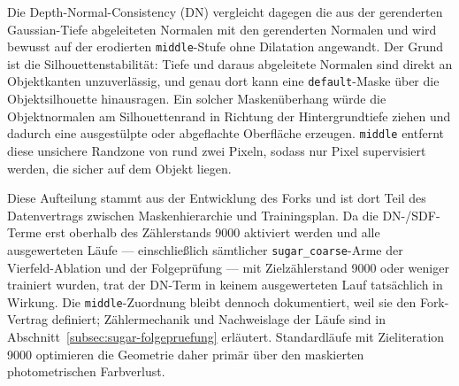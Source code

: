 Die Depth-Normal-Consistency (DN) vergleicht dagegen die aus der gerenderten
Gaussian-Tiefe abgeleiteten Normalen mit den gerenderten Normalen und wird
bewusst auf der erodierten \texttt{middle}-Stufe ohne Dilatation angewandt.
Der Grund ist die Silhouettenstabilität: Tiefe und daraus abgeleitete Normalen
sind direkt an Objektkanten unzuverlässig, und genau dort kann eine
\texttt{default}-Maske über die Objektsilhouette hinausragen. Ein solcher
Maskenüberhang würde die Objektnormalen am Silhouettenrand in Richtung der
Hintergrundtiefe ziehen und dadurch eine ausgestülpte oder abgeflachte
Oberfläche erzeugen. \texttt{middle} entfernt diese unsichere Randzone von
rund zwei Pixeln, sodass nur Pixel supervisiert werden, die sicher auf dem
Objekt liegen.

Diese Aufteilung stammt aus der Entwicklung des Forks und ist dort Teil des
Datenvertrags zwischen Maskenhierarchie und Trainingsplan. Da die
DN-/SDF-Terme erst oberhalb des Zählerstands 9000 aktiviert werden und alle
ausgewerteten Läufe — einschließlich sämtlicher \texttt{sugar\_coarse}-Arme
der Vierfeld-Ablation und der Folgeprüfung — mit Zielzählerstand 9000 oder
weniger trainiert wurden, trat der DN-Term in keinem ausgewerteten Lauf
tatsächlich in Wirkung. Die \texttt{middle}-Zuordnung bleibt dennoch
dokumentiert, weil sie den Fork-Vertrag definiert; Zählermechanik und
Nachweislage der Läufe sind in Abschnitt~\ref{subsec:sugar-folgepruefung}
erläutert. Standardläufe mit Zieliteration 9000 optimieren die Geometrie
daher primär über den maskierten photometrischen Farbverlust.


